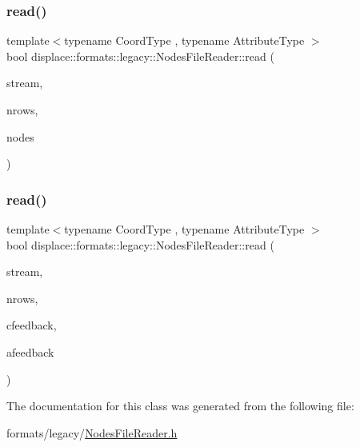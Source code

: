 \subsubsection{\texorpdfstring{read()}{read()}\hspace{0.1cm}{\footnotesize\ttfamily [1/2]}}
{\footnotesize\ttfamily template$<$typename Coord\+Type , typename Attribute\+Type $>$ \\
bool displace\+::formats\+::legacy\+::\+Nodes\+File\+Reader\+::read (\begin{DoxyParamCaption}\item[{std\+::istream \&}]{stream,  }\item[{unsigned int}]{nrows,  }\item[{std\+::vector$<$ \mbox{\hyperlink{classdisplace_1_1formats_1_1legacy_1_1_nodes_file_reader_a366283f07d187605ddd50f9ca7f9872a}{Node}}$<$ Coord\+Type, Attribute\+Type $>$$>$ \&}]{nodes }\end{DoxyParamCaption})\hspace{0.3cm}{\ttfamily [inline]}}

\mbox{\label{classdisplace_1_1formats_1_1legacy_1_1_nodes_file_reader_a06dd01500dc63c99141f74f049ccc2b2}} 
\subsubsection{\texorpdfstring{read()}{read()}\hspace{0.1cm}{\footnotesize\ttfamily [2/2]}}
{\footnotesize\ttfamily template$<$typename Coord\+Type , typename Attribute\+Type $>$ \\
bool displace\+::formats\+::legacy\+::\+Nodes\+File\+Reader\+::read (\begin{DoxyParamCaption}\item[{std\+::istream \&}]{stream,  }\item[{unsigned int}]{nrows,  }\item[{\mbox{\hyperlink{classdisplace_1_1formats_1_1legacy_1_1_nodes_file_reader_afafb20437b7e3bf2a9b6c63c3eb030e3}{Coord\+Feedback}}$<$ Coord\+Type $>$}]{cfeedback,  }\item[{\mbox{\hyperlink{classdisplace_1_1formats_1_1legacy_1_1_nodes_file_reader_aaace2a27c97ca3c31e9a177d4776afc8}{Attribute\+Feedback}}$<$ Attribute\+Type $>$}]{afeedback }\end{DoxyParamCaption})\hspace{0.3cm}{\ttfamily [inline]}}



The documentation for this class was generated from the following file\+:\begin{DoxyCompactItemize}
\item 
formats/legacy/\mbox{\hyperlink{_nodes_file_reader_8h}{Nodes\+File\+Reader.\+h}}\end{DoxyCompactItemize}
